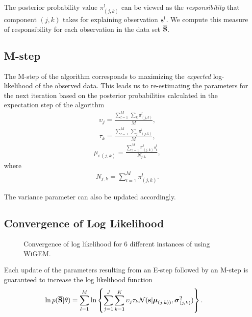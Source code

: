 \noindent The posterior probability value $\pi_{(j,k)}^{l}$ can be viewed as the {\it responsibility} that component $(j,k)$ takes for explaining observation ${\bf {s}}^{l}$. We compute this measure of responsibility for each observation in the data set ${\bf \overline{S}}$.

\subsection{M-step}
\label{subsec:mstep}

The M-step of the algorithm corresponds to maximizing
the \emph{expected} log-likelihood of the observed data. This leads us to re-estimating the parameters for the next iteration based on the posterior probabilities calculated in the expectation step of the algorithm
\begin{align}
\upsilon_{j} = \frac { \sum_{l=1}^{M} \ \sum_{k} \pi_{(j,k)}^{l}} {M},
\end{align}
\begin{align}
\tau_{k} = \frac { \sum_{l=1}^{M} \ \sum_{j} \pi_{(j,k)}^{l}} {M},
\end{align}
\begin{align}
\mu_{i \ (j,k)} = \frac  { \sum_{l=1}^{M} \pi_{(j,k)}^{l} s_{i}^{l}} {N_{j,k}},
\end{align}
where
\begin{align}
{N_{j,k}} = \sum_{l=1}^{M} \pi_{(j,k)}^{l}.
\end{align}

The variance parameter can also be updated accordingly.

\subsection{Convergence of Log Likelihood}
\label{subsec:convergenceofloglikelihood}

\begin{figure}
\centering
{}
\caption{Convergence of log likelihood for 6 different instances of using WiGEM.}
\label{fig:loglikelihood}
\end{figure}

Each update of the parameters resulting from an E-step followed by an
M-step is guaranteed to increase the log likelihood function
\begin{align}
\ln p({\bf \overline{S}} | {\bf \theta}) &= \sum_{l=1}^{M} \ln \left\{
\sum_{j=1}^J \sum_{k=1}^K \upsilon_{j} \tau_{k} \mathcal{N}(\mathbf{s} |  \boldsymbol\mu_{(j,k))},\boldsymbol\sigma_{(j,k)}^2) \right\}.
\end{align}


